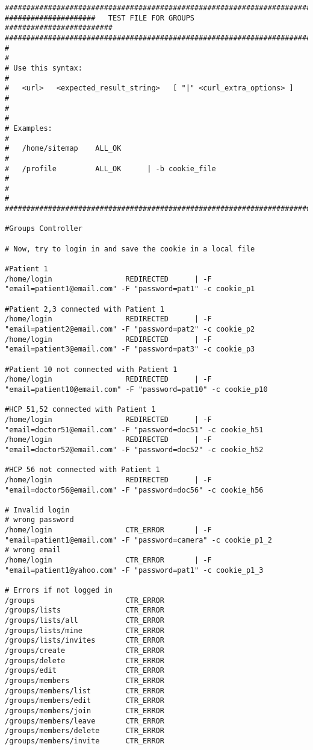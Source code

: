 \begin{verbatim}
########################################################################
#####################   TEST FILE FOR GROUPS   #########################
########################################################################
#                                                                      #
# Use this syntax:                                                     #
#   <url>   <expected_result_string>   [ "|" <curl_extra_options> ]    #
#                                                                      #
# Examples:                                                            #
#   /home/sitemap    ALL_OK                                            #
#   /profile         ALL_OK      | -b cookie_file                      #
#                                                                      #
########################################################################

#Groups Controller

# Now, try to login in and save the cookie in a local file

#Patient 1
/home/login					REDIRECTED		| -F "email=patient1@email.com" -F "password=pat1" -c cookie_p1

#Patient 2,3 connected with Patient 1
/home/login					REDIRECTED		| -F "email=patient2@email.com" -F "password=pat2" -c cookie_p2
/home/login					REDIRECTED		| -F "email=patient3@email.com" -F "password=pat3" -c cookie_p3

#Patient 10 not connected with Patient 1
/home/login					REDIRECTED		| -F "email=patient10@email.com" -F "password=pat10" -c cookie_p10

#HCP 51,52 connected with Patient 1
/home/login					REDIRECTED		| -F "email=doctor51@email.com" -F "password=doc51" -c cookie_h51
/home/login					REDIRECTED		| -F "email=doctor52@email.com" -F "password=doc52" -c cookie_h52

#HCP 56 not connected with Patient 1
/home/login					REDIRECTED		| -F "email=doctor56@email.com" -F "password=doc56" -c cookie_h56

# Invalid login
# wrong password
/home/login					CTR_ERROR		| -F "email=patient1@email.com" -F "password=camera" -c cookie_p1_2
# wrong email
/home/login					CTR_ERROR		| -F "email=patient1@yahoo.com" -F "password=pat1" -c cookie_p1_3

# Errors if not logged in
/groups						CTR_ERROR
/groups/lists				CTR_ERROR
/groups/lists/all			CTR_ERROR
/groups/lists/mine			CTR_ERROR
/groups/lists/invites		CTR_ERROR
/groups/create				CTR_ERROR
/groups/delete				CTR_ERROR
/groups/edit				CTR_ERROR
/groups/members				CTR_ERROR
/groups/members/list		CTR_ERROR
/groups/members/edit		CTR_ERROR
/groups/members/join		CTR_ERROR
/groups/members/leave		CTR_ERROR
/groups/members/delete		CTR_ERROR
/groups/members/invite		CTR_ERROR



\end{verbatim}
